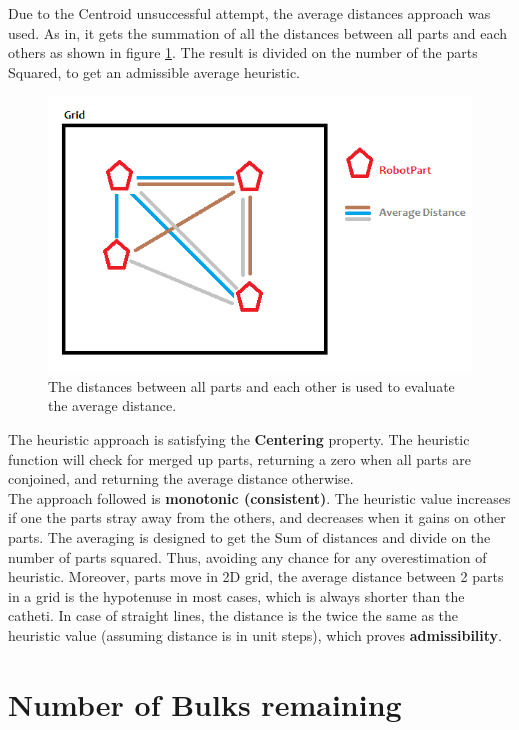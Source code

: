 Due to the Centroid unsuccessful attempt, the average distances approach was used. As in, it gets the summation of all the distances between all parts and each others as shown in figure \ref{fig:averagedistance}. The result is divided on the number of the parts Squared, to get an admissible average heuristic.

\begin{figure}[H] 
   	\centering
	\includegraphics[scale=0.6]{images/averagedistance} 
    \caption{The distances between all parts and each other is used to evaluate the average distance. }
    \label{fig:averagedistance} 
\end{figure}

The heuristic approach is satisfying the \textbf{Centering} property. The heuristic function will check for merged up parts, returning a zero when all parts are conjoined, and returning the average distance otherwise. \\

The approach followed is \textbf{monotonic (consistent)}. The heuristic value increases if one the parts stray away from the others, and decreases when it gains on other parts. The averaging is designed to get the Sum of distances and divide on the number of parts squared. Thus, avoiding any chance for any overestimation of heuristic. Moreover, parts move in 2D grid, the average distance between 2 parts in a grid is the hypotenuse in most cases, which is always shorter than the catheti. In case of straight lines, the distance is the twice the same as the heuristic value (assuming distance is in unit steps), which proves \textbf{admissibility}.	


\section{Number of Bulks remaining}

